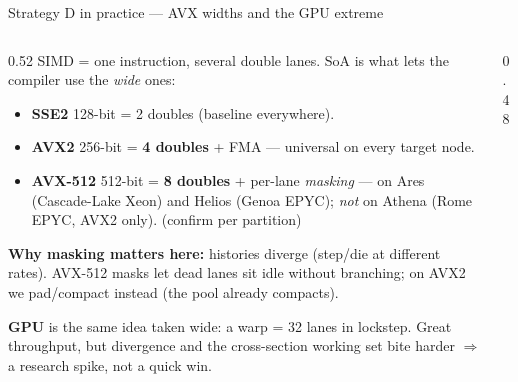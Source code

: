 \documentclass[aspectratio=169,10pt]{beamer}
\newcommand{\code}[1]{{\ttfamily\footnotesize #1}}
\begin{document}
\begin{frame}{Strategy D in practice — AVX widths and the GPU extreme}
  \begin{columns}[T]
    \begin{column}{0.52\textwidth}
      \small
      SIMD = one instruction, several \code{double} lanes. SoA is what lets the
      compiler use the \emph{wide} ones:
      \begin{itemize}\scriptsize\itemsep1pt
        \item \textbf{SSE2} 128-bit = 2 doubles (baseline everywhere).
        \item \textbf{AVX2} 256-bit = \textbf{4 doubles} + FMA — universal on
              every target node.
        \item \textbf{AVX-512} 512-bit = \textbf{8 doubles} + per-lane
              \emph{masking} — on Ares (Cascade-Lake Xeon) and Helios
              (Genoa EPYC); \emph{not} on Athena (Rome EPYC, AVX2 only).
              \footnotesize\textcolor{oshGrey}{(confirm per partition)}
      \end{itemize}
      \textbf{Why masking matters here:} histories diverge (step/die at
      different rates). AVX-512 masks let dead lanes sit idle without
      branching; on AVX2 we pad/compact instead (the pool already compacts).
      \medskip

      \textbf{GPU} is the same idea taken wide: a warp = 32 lanes in lockstep.
      Great throughput, but divergence and the cross-section working set bite
      harder $\Rightarrow$ a research spike, not a quick win.
    \end{column}
    \begin{column}{0.48\textwidth}
      \centering
    \end{column}
  \end{columns}
\end{frame}
\end{document}
